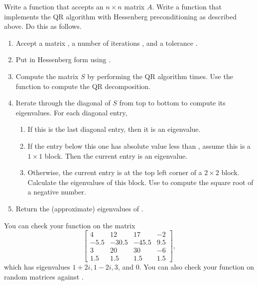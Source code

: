 \begin{problem}
Write a function that accepts an $n \times n$ matrix $A$.
Write a function that implements the QR algorithm with Hessenberg preconditioning as described above.
Do this as follows.
\begin{enumerate}
    \item Accept a matrix , a number of iterations , and a tolerance .
    \item Put  in Hessenberg form using .
    \item Compute the matrix $S$ by performing the QR algorithm  times.
    Use the function  to compute the QR decomposition.
    \item Iterate through the diagonal of $S$ from top to bottom to compute its eigenvalues.
    For each diagonal entry,
    \begin{enumerate}
        \item If this is the last diagonal entry, then it is an eigenvalue.
        \item If the entry below this one has absolute value less than , assume this is a $1\times 1$ block.
        Then the current entry is an eigenvalue.
        \item Otherwise, the current entry is at the top left corner of a $2 \times 2$ block.
        Calculate the eigenvalues of this block.
        Use  to compute the square root of a negative number.
    \end{enumerate}
    \item Return the (approximate) eigenvalues of .
\end{enumerate}
You can check your function on the matrix
\[
\left[\begin{array}{cccc}
 4   &  12   &  17   & -2   \\
-5.5 & -30.5 & -45.5 &  9.5 \\
 3   &  20   &  30   & -6   \\
 1.5 &  1.5  &  1.5  &  1.5
\end{array}\right],
\]
which has eigenvalues $1+2i, 1-2i, 3$, and $0$.
You can also check your function on random matrices against .
\label{prob:qr_solver}
\end{problem}


